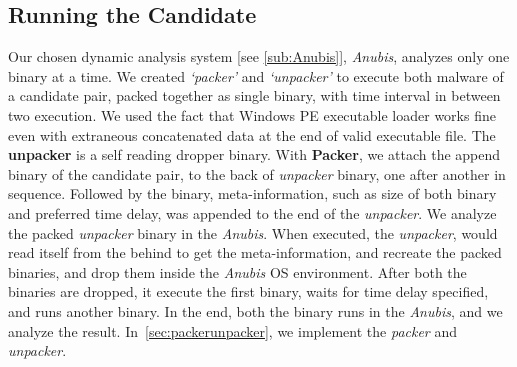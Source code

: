 \subsection{Running the Candidate}
\label{sub:Running the Candidate}
Our chosen dynamic analysis system [see \autoref{sub:Anubis}], \emph{Anubis}, analyzes only one binary at a time.
We created \emph{`packer'} and \emph{`unpacker'} to execute both malware of a candidate pair, packed together as single binary, with time interval in between two execution.
We used the fact that Windows PE executable loader works fine even with extraneous concatenated data at the end of valid executable file.
The \textbf{unpacker} is a self reading dropper binary.
With \textbf{Packer}, we attach the append binary of the candidate pair, to the back of \emph{unpacker} binary, one after another in sequence.
Followed by the binary, meta-information, such as size of both binary and preferred time delay, was appended to the end of the \emph{unpacker}.
We analyze the packed \emph{unpacker} binary in the \emph{Anubis}.
When executed, the \emph{unpacker}, would read itself from the behind to get the meta-information, and recreate the packed binaries, and drop them inside the \emph{Anubis} OS environment.
After both the binaries are dropped, it execute the first binary, waits for time delay specified, and runs another binary.
In the end, both the binary runs in the \emph{Anubis}, and we analyze the result.
In~\autoref{sec:packerunpacker}, we implement the \emph{packer} and \emph{unpacker}.
